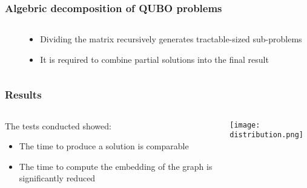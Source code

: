 \documentclass[aspectratio=169]{beamer}
\begin{document}
\begin{frame}\frametitle{Algebric decomposition of QUBO problems}

    \begin{columns}
        \begin{column}{0.5\textwidth}
            \begin{center}
            \end{center}
        \end{column}
        \begin{column}{0.5\textwidth}
            \begin{itemize}
                \item Dividing the matrix recursively generates tractable-sized sub-problems
                \item It is required to combine partial solutions into the final result
            \end{itemize}
        \end{column}
    \end{columns}

\end{frame}

\begin{frame}\frametitle{Results}

    \begin{columns}
        \begin{column}{0.4\textwidth}
            The tests conducted showed:

            \begin{itemize}
                \item The time to produce a solution is comparable
                \item The time to compute the embedding of the graph is significantly reduced
            \end{itemize}
        \end{column}
        \begin{column}{0.6\textwidth}
            \begin{flushright}
                \texttt{[image: distribution.png]}            \end{flushright}
        \end{column}
    \end{columns}

\end{frame}
\end{document}
